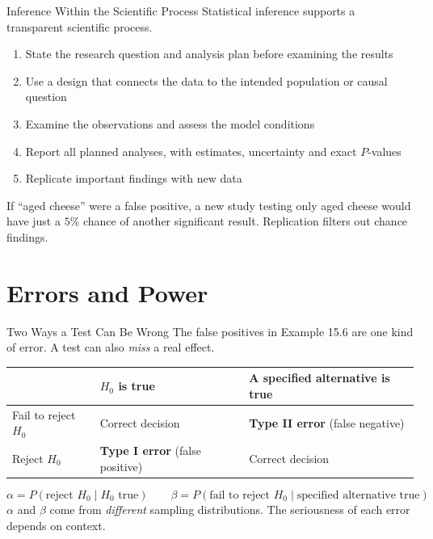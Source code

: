 \documentclass[aspectratio=169]{beamer}
\begin{document}
\begin{frame}{Inference Within the Scientific Process}
Statistical inference supports a transparent scientific process.

\begin{enumerate}
  \item State the research question and analysis plan before examining the results
  \item Use a design that connects the data to the intended population or causal question
  \item Examine the observations and assess the model conditions
  \item Report all planned analyses, with estimates, uncertainty and exact $P$-values
  \item Replicate important findings with new data
\end{enumerate}

\vspace{0.2cm}
If ``aged cheese'' were a false positive, a new study testing only aged cheese would have just a $5\%$ chance of another significant result. Replication filters out chance findings.
\end{frame}

\section{Errors and Power}

\begin{frame}{Two Ways a Test Can Be Wrong}
The false positives in Example 15.6 are one kind of error. A test can also \emph{miss} a real effect.
\begin{center}
\begin{tabularx}{0.92\textwidth}{>{\RaggedRight\arraybackslash}p{} X X}
\toprule
 & \textbf{$H_0$ is true} & \textbf{A specified alternative is true} \\
\midrule
Fail to reject $H_0$ & Correct decision & \textbf{Type II error} (false negative) \\
Reject $H_0$ & \textbf{Type I error} (false positive) & Correct decision \\
\bottomrule
\end{tabularx}
\end{center}
$$\alpha=P(\text{reject }H_0\mid H_0\text{ true}) \qquad \beta=P(\text{fail to reject }H_0\mid\text{specified alternative true})$$
$\alpha$ and $\beta$ come from \emph{different} sampling distributions. The seriousness of each error depends on context.
\end{frame}
\end{document}
